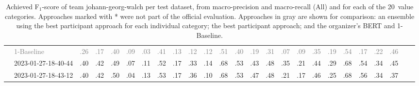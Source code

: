 \begin{table*}
\begin{tabular}{@{}ll@{\hspace{10pt}}c@{\hspace{5pt}}cccccccccccccccccccccc@{}}
& \textcolor{gray}{1-Baseline} & \textcolor{gray}{.26} & \textcolor{gray}{.17} & \textcolor{gray}{.40} & \textcolor{gray}{.09} & \textcolor{gray}{.03} & \textcolor{gray}{.41} & \textcolor{gray}{.13} & \textcolor{gray}{.12} & \textcolor{gray}{.12} & \textcolor{gray}{.51} & \textcolor{gray}{.40} & \textcolor{gray}{.19} & \textcolor{gray}{.31} & \textcolor{gray}{.07} & \textcolor{gray}{.09} & \textcolor{gray}{.35} & \textcolor{gray}{.19} & \textcolor{gray}{.54} & \textcolor{gray}{.17} & \textcolor{gray}{.22} & \textcolor{gray}{.46} \\
& 2023-01-27-18-40-44 & .40 & .42 & .49 & .07 & .11 & .52 & .17 & .33 & .14 & .68 & .53 & .43 & .48 & .35 & .21 & .44 & .29 & .68 & .54 & .34 & .45 \\
& 2023-01-27-18-43-12 & .40 & .42 & .50 & .04 & .13 & .53 & .17 & .36 & .10 & .68 & .53 & .47 & .48 & .21 & .17 & .46 & .25 & .68 & .56 & .34 & .37 \\
\bottomrule
\end{tabular}
\caption{Achieved F$_1$-score of team johann-georg-walch per test dataset, from macro-precision and macro-recall (All) and for each of the 20~value categories. Approaches marked with * were not part of the official evaluation. Approaches in gray are shown for comparison: an ensemble using the best participant approach for each individual category; the best participant approach; and the organizer's BERT and 1-Baseline.}
\label{table-results}
\end{table*}
